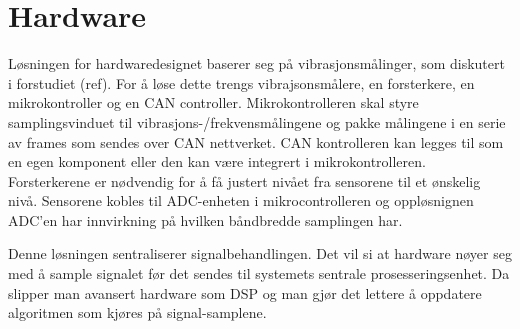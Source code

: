 
\section{Hardware}

Løsningen for hardwaredesignet baserer seg på vibrasjonsmålinger, som diskutert
i forstudiet (ref). For å løse dette trengs vibrajsonsmålere, en forsterkere,
en mikrokontroller og en CAN controller. Mikrokontrolleren skal styre
samplingsvinduet til vibrasjons-/frekvensmålingene og pakke målingene i en serie
av frames som sendes over CAN nettverket. CAN kontrolleren kan legges til som en
egen komponent eller den kan være integrert i mikrokontrolleren. Forsterkerene er
nødvendig for å få justert nivået fra sensorene til et ønskelig nivå. Sensorene
kobles til ADC-enheten i mikrocontrolleren og oppløsnignen ADC'en
har innvirkning på hvilken båndbredde samplingen har. 

Denne løsningen sentraliserer signalbehandlingen. Det vil si at hardware nøyer
seg med å sample signalet før det sendes til systemets sentrale
prosesseringsenhet. Da slipper man avansert hardware som DSP og man gjør det
lettere å oppdatere algoritmen som kjøres på signal-samplene.
